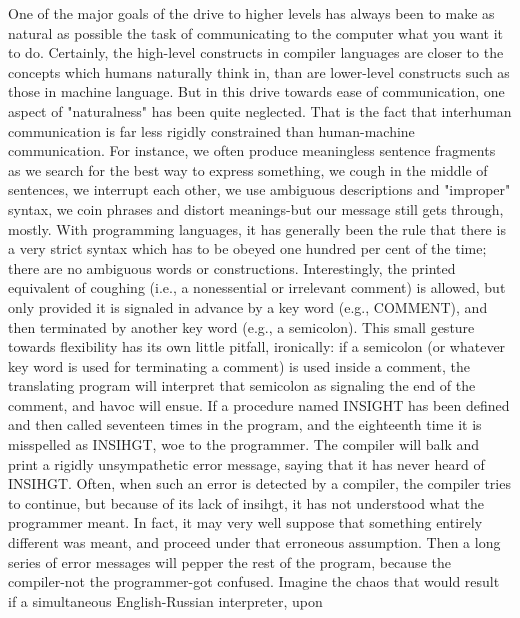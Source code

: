        One of the major goals of the drive to higher levels has always been to make as
       natural as possible the task of communicating to the computer what you want it to
       do. Certainly, the high-level constructs in compiler languages are closer to the
       concepts which humans naturally think in, than are lower-level constructs such as
       those in machine language. But in this drive towards ease of communication, one
       aspect of "naturalness" has been quite neglected. That is the fact that interhuman
       communication is far less rigidly constrained than human-machine
       communication. For instance, we often produce meaningless sentence fragments
       as we search for the best way to express something, we cough in the middle of
       sentences, we interrupt each other, we use ambiguous descriptions and "improper"
       syntax, we coin phrases and distort meanings-but our message still gets through,
       mostly. With programming languages, it has generally been the rule that there is a
       very strict syntax which has to be obeyed one hundred per cent of the time; there
       are no ambiguous words or constructions. Interestingly, the printed equivalent of
       coughing (i.e., a nonessential or irrelevant comment) is allowed, but only
       provided it is signaled in advance by a key word (e.g., COMMENT), and then
       terminated by another key word (e.g., a semicolon). This small gesture towards
       flexibility has its own little pitfall, ironically: if a semicolon (or whatever key
       word is used for terminating a comment) is used inside a comment, the translating
       program will interpret that semicolon as signaling the end of the comment, and
       havoc will ensue.
       If a procedure named INSIGHT has been defined and then called seventeen times
       in the program, and the eighteenth time it is misspelled as INSIHGT, woe to the
       programmer. The compiler will balk and print a rigidly unsympathetic error
       message, saying that it has never heard of INSIHGT. Often, when such an error
       is detected by a compiler, the compiler tries to continue, but because of its lack of
       insihgt, it has not understood what the programmer meant. In fact, it may very
       well suppose that something entirely different was meant, and proceed under that
       erroneous assumption. Then a long series of error messages will pepper the rest of
       the program, because the compiler-not the programmer-got confused. Imagine the
       chaos that would result if a simultaneous English-Russian interpreter, upon
